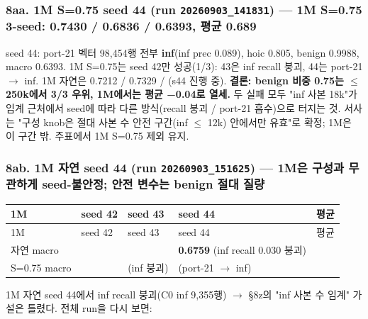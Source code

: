 \subsubsection{8aa. 1M S=\allowbreak{}0.75 seed 44 (run \texttt{20260903\allowbreak{}\_\allowbreak{}\allowbreak{}141831}) — \textbf{1M S=\allowbreak{}0.75 3-seed: 0.7430 /\allowbreak{} 0.6836 /\allowbreak{} 0.6393, 평균 0.689}}
seed 44: port-21 벡터 98,454행 전부 \textbf{inf}(inf prec 0.089), hoic 0.805, benign 0.9988, macro 0.6393. 1M S=\allowbreak{}0.75는 seed 42만 성공(1/\allowbreak{}3): 43은 inf recall 붕괴, 44는 port-21 \ensuremath{\rightarrow} inf. 1M 자연은 0.7212 /\allowbreak{} 0.7329 /\allowbreak{} (s44 진행 중). \textbf{결론: benign 비중 0.75는 \ensuremath{\leq}250k에서 3/\allowbreak{}3 우위, 1M에서는 평균 −0.04로 열세.} 두 실패 모두 "inf 사본 18k"가 임계 근처에서 seed에 따라 다른 방식(recall 붕괴 /\allowbreak{} port-21 흡수)으로 터지는 것. 서사는 "구성 knob은 절대 사본 수 안전 구간(inf \ensuremath{\leq} 12k) 안에서만 유효"로 확정; 1M은 이 구간 밖. 주표에서 1M S=\allowbreak{}0.75 제외 유지.

\subsubsection{8ab. 1M 자연 seed 44 (run \texttt{20260903\allowbreak{}\_\allowbreak{}\allowbreak{}151625}) — \textbf{1M은 구성과 무관하게 seed-불안정; 안전 변수는 benign 절대 질량}}
\begingroup
\footnotesize
\begin{longtable}{>{\raggedright\arraybackslash}p{}>{\raggedleft\arraybackslash}p{}>{\raggedright\arraybackslash}p{}>{\raggedright\arraybackslash}p{}>{\raggedleft\arraybackslash}p{}}
\toprule
1M & seed 42 & seed 43 & seed 44 & 평균 \\ \midrule
\endfirsthead
1M & seed 42 & seed 43 & seed 44 & 평균 \\ \midrule
\endhead
{}자연 macro & 0.7212 & 0.7329 & \textbf{0.6759} (inf recall 0.030 붕괴) & 0.710 \\
{}S=\allowbreak{}0.75 macro & 0.7430 & 0.6836 (inf 붕괴) & 0.6393 (port-21 \ensuremath{\rightarrow} inf) & 0.689 \\
\bottomrule
\end{longtable}
\endgroup
1M 자연 seed 44에서 inf recall 붕괴(C0 inf 9,355행)  \ensuremath{\rightarrow}  §8z의 "inf 사본 수 임계" 가설은 틀렸다. 전체 run을 다시 보면:

